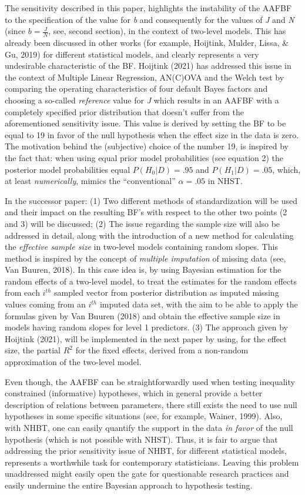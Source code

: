 \documentclass[
  english,
  man]{apa6}
\begin{document}
The sensitivity described in this paper, highlights the instability of the AAFBF to the specification of the value for \emph{b} and consequently for the values of \emph{J} and \emph{N} (since \(b=\frac{J}{N}\), see, second section), in the context of two-level models. This has already been discussed in other works (for example, Hoijtink, Mulder, Lissa, \& Gu, 2019) for different statistical models, and clearly represents a very undesirable characteristic of the BF. Hoijtink (2021) has addressed this issue in the context of Multiple Linear Regression, AN(C)OVA and the Welch test by comparing the operating characteristics of four default Bayes factors and choosing a so-called \emph{reference} value for \emph{J} which results in an AAFBF with a completely specified prior distribution that doesn't suffer from the aforementioned sensitivity issue. This value is derived by setting the BF to be equal to 19 in favor of the null hypothesis when the effect size in the data is zero. The motivation behind the (subjective) choice of the number 19, is inspired by the fact that: when using equal prior model probabilities (see equation 2) the posterior model probabilities equal \(P(H_0|D) = .95\) and \(P(H_1|D) = .05\), which, at least \emph{numerically}, mimics the ``conventional'' \(\alpha = .05\) in NHST.

In the successor paper: (1) Two different methods of standardization will be used and their impact on the resulting BF's with respect to the other two points (2 and 3) will be discussed; (2) The issue regarding the sample size will also be addressed in detail, along with the introduction of a new method for calculating the \emph{effective sample size} in two-level models containing random slopes. This method is inspired by the concept of \emph{multiple imputation} of missing data (see, Van Buuren, 2018). In this case idea is, by using Bayesian estimation for the random effects of a two-level model, to treat the estimates for the random effects from each \(i^{th}\) sampled vector from posterior distribution as imputed missing values coming from an \(i^{th}\) imputed data set, with the aim to be able to apply the formulas given by Van Buuren (2018) and obtain the effective sample size in models having random slopes for level 1 predictors. (3) The approach given by Hoijtink (2021), will be implemented in the next paper by using, for the effect size, the partial \(R^2\) for the fixed effects, derived from a non-random approximation of the two-level model.

Even though, the AAFBF can be straightforwardly used when testing inequality constrained (informative) hypotheses, which in general provide a better description of relations between parameters, there still exists the need to use null hypotheses in some specific situations (see, for example, Wainer, 1999). Also, with NHBT, one can easily quantify the support in the data \emph{in favor} of the null hypothesis (which is not possible with NHST). Thus, it is fair to argue that addressing the prior sensitivity issue of NHBT, for different statistical models, represents a worthwhile task for contemporary statisticians. Leaving this problem unaddressed might easily open the gate for questionable research practices and easily undermine the entire Bayesian approach to hypothesis testing.
\end{document}
